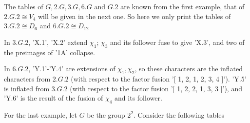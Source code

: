 
The  tables of $G,   2.G, 3.G, 6.G$  and $G.2$  are known  from the first
example, that of $2.G.2  \cong V_4$ will  be given  in the next  one.  So
here we only  print  the {\GAP} tables  of  $3.G.2 \cong D_6$  and $6.G.2
\cong D_{12}$\:

In $3.G.2$, 'X.1', 'X.2' extend $\chi_1$;  $\chi_3$ and its follower fuse
to give 'X.3', and two of the preimages of '1A' collapse.

In  $6.G.2$,  'Y.1'-'Y.4' are extensions  of  $\chi_1, \chi_2$,  so these
characters are the inflated characters  from $2.G.2$ (with respect to the
factor fusion '[ 1,  2, 1, 2, 3, 4  ]').  'Y.5' is inflated from  $3.G.2$
(with respect to the factor fusion '[ 1, 2, 2, 1,  3, 3 ]'), and 'Y.6' is
the result of the fusion of $\chi_4$ and its follower.

\newpage
For the last example, let $G$ be the group $2^2$.
Consider the following tables\:


